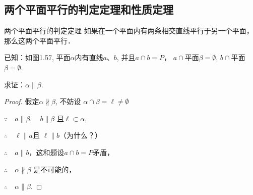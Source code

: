 \subsection{两个平面平行的判定定理和性质定理}
\begin{blk}{两个平面平行的判定定理} 
  如果在一个平面内有两条相交直线平行于另一个平面，那么这两个平面平行．
\end{blk}

已知：如图1.57, 平面$\alpha$内有直线$a$、$b$, 并且$a\cap b=P$，
$a\cap $平面$\beta=\emptyset$, 
$b\cap$平面$\beta=\emptyset$.

求证：$\alpha\parallel \beta$.


\begin{proof}
  假定$\alpha\nparallel \beta$, 不妨设
$\alpha\cap\beta=\ell\ne \emptyset$

$\because\quad a\parallel \beta,\quad b\parallel \beta$ 且$\ell\subset\alpha$,

$\therefore\quad \ell \parallel a$且 $\ell\parallel b$（为什么？）

$\therefore\quad a\parallel b$，这和题设$a\cap b=P$矛盾，

$\therefore\quad \alpha\nparallel \beta$ 是不可能的，

$\therefore\quad \alpha\parallel \beta$.
\end{proof}

